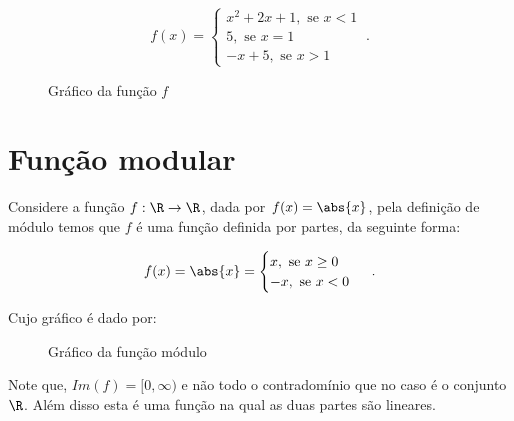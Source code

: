 \begin{exem}
\begin{equation}
f(x) = \begin{cases}
                 x^2+2x+1, \text{ se } x < 1 \\
                 5, \text{ se } x = 1 \\
                -x+5, \text{ se } x > 1
                \end{cases} \ .
\end{equation}
\begin{figure}[H]
  \centering
   \caption{Gráfico da função $f$}
  \end{figure}
\end{exem}

\section{Função modular}

  Considere a função $f: \R \rightarrow \R$, dada por $f(x)= \abs{x}$, pela definição de módulo temos que $f$ é uma função definida por partes, da seguinte forma:

  \[f(x)= \abs{x} = \begin{cases}
                 x, \text{ se } x \geq 0 \\
                 -x, \text{ se } x < 0
                \end{cases} \ .\]

 Cujo gráfico é dado por:

  \begin{figure}[H]
 \centering
    \caption{Gráfico da função módulo}
  \end{figure}

Note que, $Im(f)= [0, \infty)$ e não todo o contradomínio que no caso é o conjunto $\R$. Além disso esta é uma função na qual as duas partes são lineares.
  
